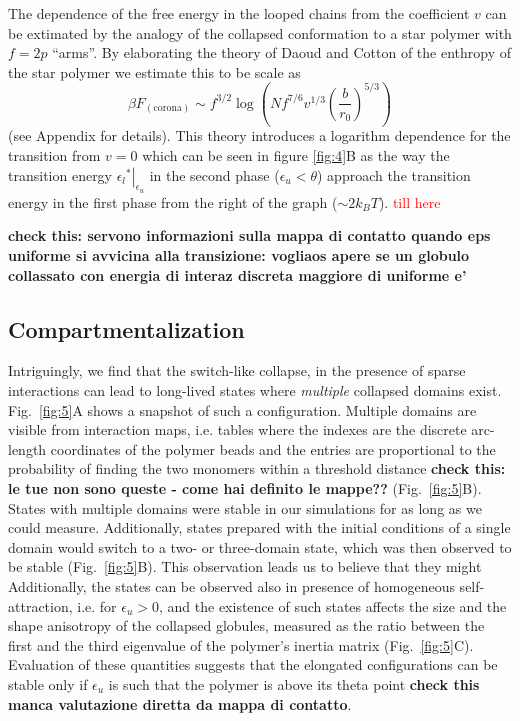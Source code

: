 \documentclass[
preprint,
a4paper,
12pt,
superscriptaddress,
pre]{revtex4}
\newcommand{\rev}[1]{\textcolor{red}{#1}}
\begin{document}
The dependence of the free energy in the looped chains from the
coefficient $v$ can be extimated by the analogy of the collapsed
conformation to a star polymer with $f = 2 p$ ``arms''. By elaborating
the theory of Daoud and Cotton\cite{Daoud1982} of the enthropy of the
star polymer we estimate this to be scale as
\begin{equation}
\beta F_\mathrm{(corona)} \sim f^{3/2} \log\left(Nf^{7/6} v^{1/3}
  \left( \frac{b}{r_0}\right)^{5/3} \right)
\end{equation}
(see Appendix for details). This theory introduces a logarithm
dependence for the transition from $v = 0$ which can be seen in figure
\ref{fig:4}B as the way the transition energy
$\left.{\epsilon_l}^*\right|_{\epsilon_u}$ in the second phase
($\epsilon_u < \theta$) approach the transition energy in the first
phase from the right of the graph ($\sim 2 k_B T$).
\rev{till here}


\textbf{check this: servono  informazioni sulla mappa di contatto
  quando eps uniforme si avvicina alla transizione: vogliaos apere se
  un globulo collassato con energia di interaz discreta maggiore di
  uniforme e'  }


\subsection*{Compartmentalization}


Intriguingly, we find that the switch-like collapse, in the presence
of sparse interactions can lead to long-lived states where
\emph{multiple} collapsed domains exist. Fig.~\ref{fig:5}A shows a
snapshot of such a configuration. Multiple domains are visible from
interaction maps, i.e. tables where the indexes are the discrete
arc-length coordinates of the polymer beads and the entries are
proportional to the probability of finding the two monomers within a
threshold distance \textbf{check this: le tue non sono queste - come
  hai definito le mappe??} (Fig.~\ref{fig:5}B). States with multiple
domains were stable in our simulations for as long as we could
measure. Additionally, states prepared with the initial conditions of
a single domain would switch to a two- or three-domain state, which
was then observed to be stable (Fig.~\ref{fig:5}B). This observation
leads us to believe that they might 
%
Additionally, the states can be observed also in presence of
homogeneous self-attraction, i.e. for $\epsilon_u>0$, and the
existence of such states affects the size and the shape anisotropy of
the collapsed globules, measured as the ratio between the first and
the third eigenvalue of the polymer's inertia matrix
(Fig.~\ref{fig:5}C). Evaluation of these quantities suggests that the
elongated configurations can be stable only if $\epsilon_u$ is such
that the polymer is above its theta point \textbf{check this manca
  valutazione diretta da mappa di contatto}.
\end{document}
